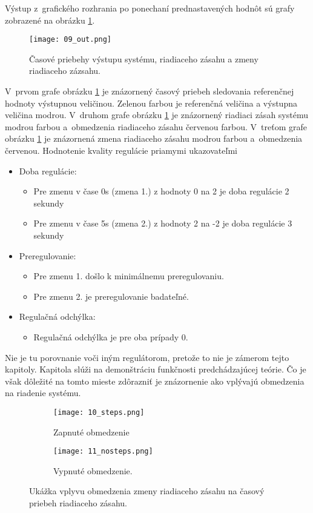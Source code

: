 Výstup z~grafického rozhrania po ponechaní prednastavených hodnôt sú grafy zobrazené na obrázku  \ref{09_out}.

\begin{figure}[!htbp]
\centering
\texttt{[image: 09\_out.png]}
\caption{Časové priebehy výstupu systému, riadiaceho zásahu a zmeny riadiaceho zázsahu.}
\label{09_out}
\end{figure}


V~prvom grafe obrázku  \ref{09_out} je znázornený časový priebeh sledovania referenčnej hodnoty výstupnou veličinou. Zelenou farbou je referenčná veličina a výstupna veličina modrou.
V~druhom grafe obrázku  \ref{09_out} je znázornený
riadiaci zásah systému modrou farbou a~obmedzenia riadiaceho zásahu červenou farbou. V~treťom grafe obrázku  \ref{09_out} je znázornená zmena riadiaceho zásahu modrou farbou
a~obmedzenia červenou. Hodnotenie kvality regulácie priamymi ukazovateľmi \cite{MPC06}

\begin{itemize}
  \item Doba regulácie:
    \begin{itemize}
  		\item
    	Pre zmenu v čase 0s (zmena 1.) z hodnoty 0 na 2 je doba regulácie 2 sekundy
    	\item
    	Pre zmenu v čase 5s (zmena 2.) z hodnoty 2 na -2 je doba regulácie 3 sekundy
	\end{itemize}
  \item Preregulovanie:
    \begin{itemize}
  		\item
    	Pre zmenu 1. došlo k minimálnemu preregulovaniu.
    	\item
    	Pre zmenu 2. je preregulovanie badateľné.
	\end{itemize}  
  \item Regulačná odchýlka:
    \begin{itemize}
  		\item
    	Regulačná odchýlka je pre oba prípady 0.
	\end{itemize}   
\end{itemize}

Nie je tu porovnanie voči iným regulátorom, pretože to nie je zámerom tejto kapitoly. Kapitola slúži na demonštráciu funkčnosti predchádzajúcej teórie. Čo je však dôležité na tomto mieste zdôrazniť je znázornenie ako vplývajú obmedzenia na riadenie systému. 

\begin{figure}[!htbp]
\centering
\begin{subfigure}{.5\textwidth}
\texttt{[image: 10\_steps.png]}
\caption{Zapnuté obmedzenie}
\label{10_steps}
\end{subfigure}%
\begin{subfigure}{.5\textwidth}
\texttt{[image: 11\_nosteps.png]}
\caption{Vypnuté obmedzenie.}
\label{11_nosteps}
\end{subfigure}
\caption{Ukážka vplyvu obmedzenia zmeny riadiaceho zásahu na časový priebeh riadiaceho zásahu.}
\end{figure}

